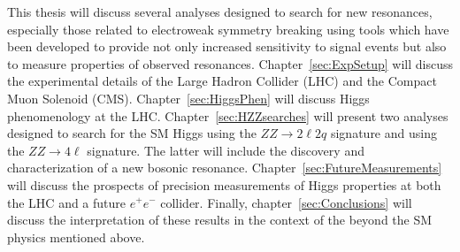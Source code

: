 This thesis will discuss several analyses designed to search for 
new resonances, especially those related to electroweak symmetry 
breaking using tools which have been developed to provide not only 
increased sensitivity to signal events but also to measure 
properties of observed resonances. 
Chapter~\ref{sec:ExpSetup} will 
discuss the experimental details of the Large Hadron Collider 
(LHC) and the Compact Muon Solenoid (CMS). 
Chapter~\ref{sec:HiggsPhen} will discuss Higgs phenomenology 
at the LHC.  Chapter~\ref{sec:HZZsearches} will
present two analyses designed to search for the SM Higgs using the 
$ZZ\to2\ell 2q$ signature and using the $ZZ\to 4\ell$ signature. 
The latter will include the discovery and characterization of 
a new bosonic resonance. Chapter~\ref{sec:FutureMeasurements} 
will discuss the prospects of precision measurements of Higgs 
properties at both the LHC and a future $e^+e^-$ collider. Finally, 
chapter~\ref{sec:Conclusions} will discuss the interpretation 
of these results in the context of the beyond the SM physics 
mentioned above.  
